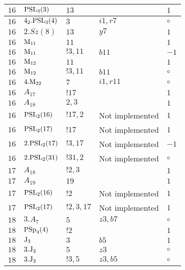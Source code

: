\documentclass[a4paper, 11pt]{article}
\begin{document}
\begin{longtable}{lllll}
        $ 16 $ & $ {\rm PSL}_{3}(3) $ & $ 13 $ & $ ~ $ & $ 1$ \\ \hline
        $ 16 $ & $ 4_2.{\rm PSL}_{3}(4) $ & $ 3 $ & $ i1, r7 $ &  $\circ$ \\ \hline
        $ 16 $ & $ 2.Sz(8) $ & $ 13 $ & $ y7 $ & $ 1$ \\ \hline
        $ 16 $ & $ {\rm M}_{11} $ & $ 11 $ & $ ~ $ & $ 1$ \\ \hline
        $ 16 $ & $ {\rm M}_{11} $ & $ ! 3,11 $ & $ b11 $ & $ -1$ \\ \hline
        $ 16 $ & $ {\rm M}_{12} $ & $ 11 $ & $ ~ $ & $ 1$ \\ \hline
        $ 16 $ & $ {\rm M}_{12} $ & $ ! 3,11 $ & $ b11 $ &  $\circ$ \\ \hline
        $ 16 $ & $ 4.{\rm M}_{22} $ & $ 7 $ & $ i1, r11 $ &  $\circ$ \\ \hline
        $ 16 $ & $ A_{17} $ & $ !17 $ & $ ~ $ & $ 1$ \\ \hline
        $ 16 $ & $ A_{18} $ & $ 2, 3 $ & $ ~ $ & $ 1$ \\ \hline
        $ 16 $ & $ {\rm PSL}_{2}(16) $ & $ !17, 2 $ &  Not implemented & $ 1$ \\ \hline
        $ 16 $ & $ {\rm PSL}_{2}(17) $ & $ !17 $ &  Not implemented & $ 1$ \\ \hline
        $ 16 $ & $ 2.{\rm PSL}_{2}(17) $ & $ !3, 17 $ &  Not implemented & $ -1$ \\ \hline
        $ 16 $ & $ 2.{\rm PSL}_{2}(31) $ & $ !31, 2 $ &  Not implemented &  $\circ$ \\ \hline
        $ 17 $ & $ A_{18} $ & $ !2, 3 $ & $ ~ $ & $ 1$ \\ \hline
        $ 17 $ & $ A_{19} $ & $ 19 $ & $ ~ $ & $ 1$ \\ \hline
        $ 17 $ & $ {\rm PSL}_{2}(16) $ & $ !2 $ &  Not implemented & $ 1$ \\ \hline
        $ 17 $ & $ {\rm PSL}_{2}(17) $ & $ !2, 3, 17 $ &  Not implemented & $ 1$ \\ \hline
        $ 18 $ & $ 3.A_{7} $ & $ 5 $ & $ z3, b7 $ &  $\circ$ \\ \hline
        $ 18 $ & $ {\rm PSp}_{4}(4) $ & $ ! 2 $ & $ ~ $ & $ 1$ \\ \hline
        $ 18 $ & $ {\rm J}_3 $ & $ 3 $ & $ b5 $ & $ 1$ \\ \hline
        $ 18 $ & $ 3.{\rm J}_3 $ & $ 5 $ & $ z3 $ &  $\circ$ \\ \hline
        $ 18 $ & $ 3.{\rm J}_3 $ & $ ! 3,5 $ & $ z3, b5 $ &  $\circ$ \\ \hline

\end{longtable}
\end{document}
